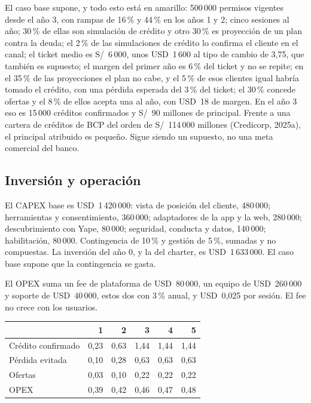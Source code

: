 \documentclass[11pt]{article}
\newcommand{\usd}[1]{USD~#1}
\newcommand{\pen}[1]{S/~#1}
\begin{document}
El caso base supone, y todo esto está en amarillo: 500\,000 permisos vigentes desde el año 3, con rampas de 16\,\% y 44\,\% en los años 1 y 2; cinco sesiones al año; 30\,\% de ellas son simulación de crédito y otro 30\,\% es proyección de un plan contra la deuda; el 2\,\% de las simulaciones de crédito lo confirma el cliente en el canal; el ticket medio es \pen{6\,000}, unos \usd{1\,600} al tipo de cambio de 3,75, que también es supuesto; el margen del primer año es 6\,\% del ticket y no se repite; en el 35\,\% de las proyecciones el plan no cabe, y el 5\,\% de esos clientes igual habría tomado el crédito, con una pérdida esperada del 3\,\% del ticket; el 30\,\% concede ofertas y el 8\,\% de ellos acepta una al año, con \usd{18} de margen. En el año 3 eso es 15\,000 créditos confirmados y \pen{90} millones de principal. Frente a una cartera de créditos de BCP del orden de \pen{114\,000} millones (Credicorp, 2025a), el principal atribuido es pequeño. Sigue siendo un supuesto, no una meta comercial del banco.

\subsection{Inversión y operación}

El CAPEX base es \usd{1\,420\,000}: vista de posición del cliente, 480\,000; herramientas y consentimiento, 360\,000; adaptadores de la app y la web, 280\,000; descubrimiento con Yape, 80\,000; seguridad, conducta y datos, 140\,000; habilitación, 80\,000. Contingencia de 10\,\% y gestión de 5\,\%, sumadas y no compuestas. La inversión del año 0, y la del charter, es \usd{1\,633\,000}. El caso base supone que la contingencia se gasta.

El OPEX suma un fee de plataforma de \usd{80\,000}, un equipo de \usd{260\,000} y soporte de \usd{40\,000}, estos dos con 3\,\% anual, y \usd{0{,}025} por sesión. El fee no crece con los usuarios.

\begin{table}[ht]
\centering
\small
\begin{tabular}{lrrrrr}
\toprule
 & \textbf{1} & \textbf{2} & \textbf{3} & \textbf{4} & \textbf{5} \\
\midrule
Crédito confirmado & 0{,}23 & 0{,}63 & 1{,}44 & 1{,}44 & 1{,}44 \\
Pérdida evitada & 0{,}10 & 0{,}28 & 0{,}63 & 0{,}63 & 0{,}63 \\
Ofertas & 0{,}03 & 0{,}10 & 0{,}22 & 0{,}22 & 0{,}22 \\
OPEX & 0{,}39 & 0{,}42 & 0{,}46 & 0{,}47 & 0{,}48 \\
\bottomrule
\end{tabular}
\end{table}
\end{document}
